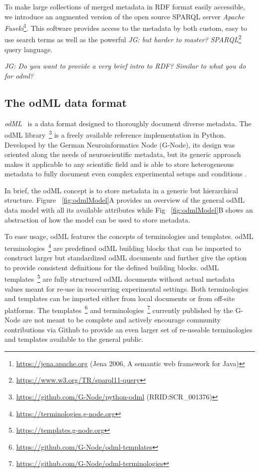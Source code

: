 \documentclass{article}
\begin{document}
To make large collections of merged metadata in RDF format easily accessible, we introduce an augmented version of the open source SPARQL server \textit{Apache Fuseki}\footnote{\url{https://jena.apache.org} (Jena 2006, A semantic web framework for Java)}. This software provides access to the metadata by both custom, easy to use search terms as well as the powerful \emph{JG: but harder to master?} %
\textit{SPARQL}\footnote{\url{https://www.w3.org/TR/sparql11-query}} query language.

\emph{JG: Do you want to provide a very brief intro to RDF? Similar to what you do for odml?}

\subsection{The odML data format} \label{sec:odml_intro}
\textit{odML}~\cite{Grewe_2011} is a data format designed to thoroughly document diverse metadata. The odML library~\footnote{\url{https://github.com/G-Node/python-odml} (RRID:SCR\_001376)} is a freely available reference implementation in Python. Developed by the German Neuroinformatics Node (G-Node), its design was oriented along the needs of neuroscientific metadata, but its generic approach makes it applicable to any scientific field and is able to store heterogeneous metadata to fully document even complex experimental setups and conditions \cite{Zehl_2016}.

In brief, the odML concept is to store metadata in a generic but hierarchical structure. Figure ~\ref{fig:odmlModel}A provides an overview of the general odML data model with all its available attributes while Fig ~\ref{fig:odmlModel}B shows an abstraction of how the model can be used to store metadata.

To ease usage, odML features the concepts of terminologies and templates. odML terminologies~\footnote{\url{https://terminologies.g-node.org}} are predefined odML building blocks that can be imported to construct larger but standardized odML documents and further give the option to provide consistent definitions for the defined building blocks. odML templates~\footnote{\url{https://templates.g-node.org}} are fully structured odML documents without actual metadata values meant for re-use in reoccurring experimental settings. Both terminologies and templates can be imported either from local documents or from off-site platforms. The templates~\footnote{\url{https://github.com/G-Node/odml-templates}} and terminologies~\footnote{\url{https://github.com/G-Node/odml-terminologies}} currently published by the G-Node are not meant to be complete and actively encourage community contributions via Github to provide an even larger set of re-useable terminologies and templates available to the general public.
\end{document}

